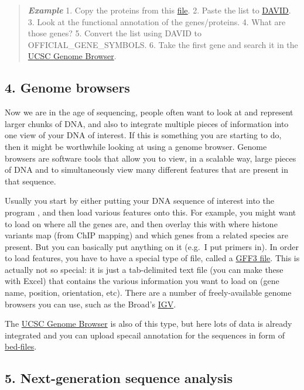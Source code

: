 \documentclass[]{article}
\begin{document}
\begin{quote}
\emph{\textbf{Example}} 1. Copy the proteins from this
\href{http://compbio.massey.ac.nz/wiki/data/c1/gene_set.txt}{file}. 2.
Paste the list to \href{http://david.abcc.ncifcrf.gov/}{DAVID}. 3. Look
at the functional annotation of the genes/proteins. 4. What are those
genes? 5. Convert the list using DAVID to OFFICIAL\_GENE\_SYMBOLS. 6.
Take the first gene and search it in the
\href{http://genome.ucsc.edu/}{UCSC Genome Browser}.
\end{quote}

\subsection{4. Genome browsers}\label{genome-browsers}

Now we are in the age of sequencing, people often want to look at and
represent larger chunks of DNA, and also to integrate multiple pieces of
information into one view of your DNA of interest. If this is something
you are starting to do, then it might be worthwhile looking at using a
genome browser. Genome browsers are software tools that allow you to
view, in a scalable way, large pieces of DNA and to simultaneously view
many different features that are present in that sequence.

Usually you start by either putting your DNA sequence of interest into
the program , and then load various features onto this. For example, you
might want to load on where all the genes are, and then overlay this
with where histone variants map (from ChIP mapping) and which genes from
a related species are present. But you can basically put anything on it
(e.g.~I put primers in). In order to load features, you have to have a
special type of file, called a
\href{http://compbio.massey.ac.nz/wiki/\#!bioinf_files.md}{GFF3 file}.
This is actually not so special: it is just a tab-delimited text file
(you can make these with Excel) that contains the various information
you want to load on (gene name, position, orientation, etc). There are a
number of freely-available genome browsers you can use, such as the
Broad's \href{https://www.broadinstitute.org/igv/home}{IGV}.

The \href{http://genome.ucsc.edu/}{UCSC Genome Browser} is also of this
type, but here lots of data is already integrated and you can upload
specail annotation for the sequences in form of
\href{http://compbio.massey.ac.nz/wiki/\#!bioinf_files.md}{bed-files}.

\subsection{5. Next-generation sequence
analysis}\label{next-generation-sequence-analysis}
\end{document}
